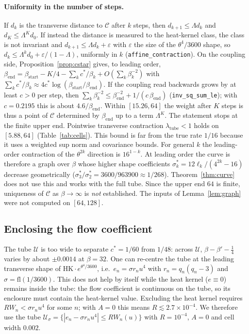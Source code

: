 \documentclass[11pt,a4paper]{article}
\theoremstyle{definition}
\theoremstyle{remark}
\newcommand{\code}[1]{\texttt{#1}}
\newcommand{\HK}{\mathrm{HK}}
\newcommand{\cU}{\mathcal{U}}
\newcommand{\cC}{\mathcal{C}}
\begin{document}
\paragraph{Uniformity in the number of steps.}
If $d_k$ is the transverse distance to $\cC$ after $k$ steps, then $d_{k+1}\le\Lambda d_k$ and $d_K\le\Lambda^Kd_0$.
If instead the distance is measured to the heat-kernel class, the class is not invariant and $d_{k+1}\le\Lambda d_k+\varepsilon$ with $\varepsilon$ the size of the $\theta^4/3600$ shape, so $d_k\le\Lambda^kd_0+\varepsilon/(1-\Lambda)$, uniformly in $k$ (\code{affine\_contraction}).
On the coupling side, Proposition~\ref{prop:cstar} gives, to leading order, $\beta_{\mathrm{end}}=\beta_{\mathrm{start}}-K/4-\sum_kc^*/\beta_k+O(\sum_k\beta_k^{-2})$ with $\sum_kc^*/\beta_k\approx4c^*\log(\beta_{\mathrm{start}}/\beta_{\mathrm{end}})$.
If the coupling read backwards grows by at least $c>0$ per step, then $\sum_k\beta_k^{-2}\le\beta_{\mathrm{end}}^{-2}+1/(c\,\beta_{\mathrm{end}})$ (\code{inv\_sq\_sum\_le}); with $c=0.2195$ this is about $4.6/\beta_{\mathrm{end}}$.
Within $[15.26,64]$ the weight after $K$ steps is thus a point of $\cC$ determined by $\beta_{\mathrm{end}}$ up to a term $\Lambda^K$.
The statement stops at the finite upper end.
Pointwise transverse contraction $\lambda_{\mathrm{tube}}<1$ holds on $[5.88,64]$ (Table~\ref{tab:cells}).
This bound is far from the true rate $1/16$ because it uses a weighted sup norm and covariance bounds.
For general $k$ the leading-order contraction of the $\theta^{2k}$ direction is $16^{1-k}$.
At leading order the curve is therefore a graph over $\beta$ whose higher shape coefficients $\sigma_k^*=12\ell_k/(4^{2k}-16)$ decrease geometrically ($\sigma_3^*/\sigma_2^*=3600/963900\approx1/268$).
Theorem~\ref{thm:curve} does not use this and works with the full tube.
Since the upper end $64$ is finite, uniqueness of $\cC$ as $\beta\to\infty$ is \emph{not} established.
The inputs of Lemma~\ref{lem:graph} were not computed on $[64,128]$.

\subsection{Enclosing the flow coefficient}
The tube $\cU$ is too wide to separate $c^*=1/60$ from $1/48$: across $\cU$, $\beta-\beta'-\tfrac14$ varies by about $\pm0.0014$ at $\beta=32$.
One can re-centre the tube at the leading transverse shape of $\HK\cdot e^{\theta^4/3600}$, i.e.\ $e_n=\sigma r_nu^4$ with $r_n=q_n(q_n-3)$ and $\sigma=\mathrm{fl}(1/3600)$.
This does not help by itself while the heat kernel ($e\equiv0$) remains inside the tube: the flow coefficient is continuous on the tube, so its enclosure must contain the heat-kernel value.
Excluding the heat kernel requires $RW_n<\sigma r_nu^4$ for some $n$; with $A=0$ this means $R\lesssim2.7\times10^{-4}$.
We therefore use the tube $\cU_\sigma=\{|e_n-\sigma r_nu^4|\le RW_n(u)\}$ with $R=10^{-4}$, $A=0$ and cell width $0.002$.
\end{document}
